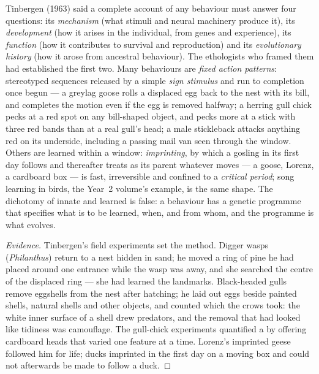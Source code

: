 \begin{definition}\label{def:b3:behavioural-ecology:tinbergen}
Tinbergen (1963) said a complete account of any behaviour must answer
four questions: its \emph{mechanism} (what stimuli and neural machinery
produce it), its \emph{development} (how it arises in the individual,
from genes and experience), its \emph{function} (how it contributes to
survival and reproduction) and its \emph{evolutionary history} (how it
arose from ancestral behaviour). The ethologists who framed them had
established the first two. Many behaviours are \emph{fixed action
patterns}: stereotyped sequences released by a simple \emph{sign
stimulus} and run to completion once begun --- a greylag goose rolls a
displaced egg back to the nest with its bill, and completes the motion
even if the egg is removed halfway; a herring gull chick pecks at a red
spot on any bill-shaped object, and pecks more at a stick with three red
bands than at a real gull's head; a male stickleback attacks anything
red on its underside, including a passing mail van seen through the
window. Others are learned within a window: \emph{imprinting}, by which
a gosling in its first day follows and thereafter treats as its parent
whatever moves --- a goose, Lorenz, a cardboard box --- is fast,
irreversible and confined to a \emph{critical period}; song learning in
birds, the Year~2 volume's example, is the same shape. The dichotomy
of innate and learned is false: a behaviour has a genetic programme
that specifies what is to be learned, when, and from whom, and the
programme is what evolves.
\end{definition}

\begin{proof}[Evidence]
Tinbergen's field experiments set the method. Digger wasps
(\emph{Philanthus}) return to a nest hidden in sand; he moved a ring of
pine  he had placed around one entrance while the wasp was away,
and she searched the centre of the displaced ring --- she had learned
the landmarks. Black-headed gulls remove eggshells from the nest after
hatching; he laid out eggs beside painted shells, natural shells and
other objects, and counted which the crows took: the white inner
surface of a shell drew predators, and the removal that had looked
like tidiness was camouflage. The gull-chick experiments quantified a
 by offering cardboard heads that varied one feature at a
time. Lorenz's imprinted geese followed him for life; ducks imprinted
in the first day on a moving box and could not afterwards be made to
follow a duck.
\end{proof}

